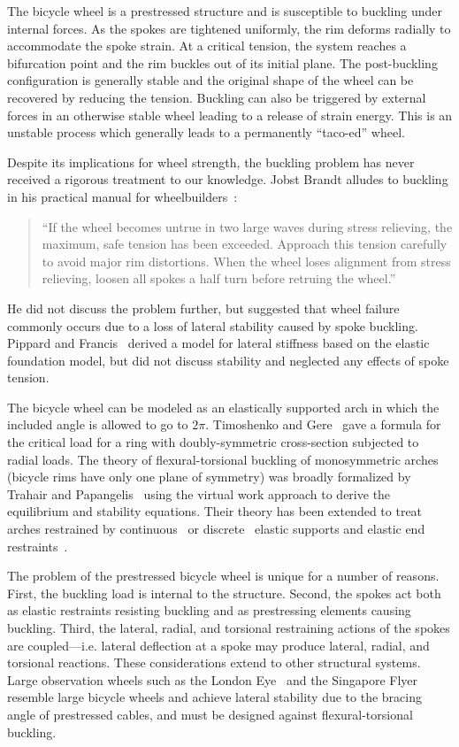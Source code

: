 \documentclass{bmd2016p}
\begin{document}
The bicycle wheel is a prestressed structure and is susceptible to buckling under internal forces. As the spokes are tightened uniformly, the rim deforms radially to accommodate the spoke strain. At a critical tension, the system reaches a bifurcation point and the rim buckles out of its initial plane. The post-buckling configuration is generally stable and the original shape of the wheel can be recovered by reducing the tension. Buckling can also be triggered by external forces in an otherwise stable wheel leading to a release of strain energy. This is an unstable process which generally leads to a permanently ``taco-ed'' wheel.

Despite its implications for wheel strength, the buckling problem has never received a rigorous treatment to our knowledge. Jobst Brandt alludes to buckling in his practical manual for wheelbuilders~\cite{Brandt1993c}:

\begin{quotation}
\noindent``If the wheel becomes untrue in two large waves during stress relieving, the maximum, safe tension has been exceeded. Approach this tension carefully to avoid major rim distortions. When the wheel loses alignment from stress relieving, loosen all spokes a half turn before retruing the wheel.''
\end{quotation}

He did not discuss the problem further, but suggested that wheel failure commonly occurs due to a loss of lateral stability caused by spoke buckling. Pippard and Francis~\cite{Pippard1932d} derived a model for lateral stiffness based on the elastic foundation model, but did not discuss stability and neglected any effects of spoke tension.

The bicycle wheel can be modeled as an elastically supported arch in which the included angle is allowed to go to $2\pi$. Timoshenko and Gere~\cite{Timoshenko1961a} gave a formula for the critical load for a ring with doubly-symmetric cross-section subjected to radial loads. The theory of flexural-torsional buckling of monosymmetric arches (bicycle rims have only one plane of symmetry) was broadly formalized by Trahair and Papangelis~\cite{Trahair1987b} using the virtual work approach to derive the equilibrium and stability equations. Their theory has been extended to treat arches restrained by continuous~\cite{Pi2002b} or discrete~\cite{Bradford2002d} elastic supports and elastic end restraints~\cite{Guo2014b}.

The problem of the prestressed bicycle wheel is unique for a number of reasons. First, the buckling load is internal to the structure. Second, the spokes act both as elastic restraints resisting buckling and as prestressing elements causing buckling. Third, the lateral, radial, and torsional restraining actions of the spokes are coupled---i.e. lateral deflection at a spoke may produce lateral, radial, and torsional reactions. These considerations extend to other structural systems. Large observation wheels such as the London Eye~\cite{Mann2001a} and the Singapore Flyer~\cite{Allsop2009a} resemble large bicycle wheels and achieve lateral stability due to the bracing angle of prestressed cables, and must be designed against flexural-torsional buckling.
\end{document}
